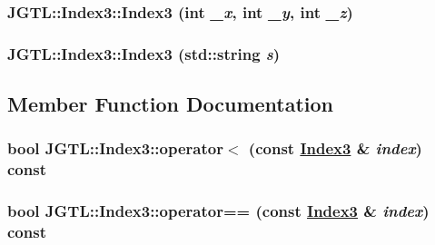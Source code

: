 \hypertarget{class_j_g_t_l_1_1_index3_31318bf64f28cdf0b0bd8aaf88dd6c80}{
\subsubsection[Index3]{\setlength{\rightskip}{0pt plus 5cm}JGTL::Index3::Index3 (int {\em \_\-x}, int {\em \_\-y}, int {\em \_\-z})}}
\label{class_j_g_t_l_1_1_index3_31318bf64f28cdf0b0bd8aaf88dd6c80}


\hypertarget{class_j_g_t_l_1_1_index3_57c5d0432d9042ef9c1c20eaff615ec7}{
\subsubsection[Index3]{\setlength{\rightskip}{0pt plus 5cm}JGTL::Index3::Index3 (std::string {\em s})}}
\label{class_j_g_t_l_1_1_index3_57c5d0432d9042ef9c1c20eaff615ec7}




\subsection{Member Function Documentation}
\hypertarget{class_j_g_t_l_1_1_index3_28b74fda507cd39db2cb49bd7a9eda11}{
\subsubsection[operator$<$]{\setlength{\rightskip}{0pt plus 5cm}bool JGTL::Index3::operator$<$ (const \hyperlink{class_j_g_t_l_1_1_index3}{Index3} \& {\em index}) const}}
\label{class_j_g_t_l_1_1_index3_28b74fda507cd39db2cb49bd7a9eda11}


\hypertarget{class_j_g_t_l_1_1_index3_e366c587a926599d5976c3ade146109a}{
\subsubsection[operator==]{\setlength{\rightskip}{0pt plus 5cm}bool JGTL::Index3::operator== (const \hyperlink{class_j_g_t_l_1_1_index3}{Index3} \& {\em index}) const}}
\label{class_j_g_t_l_1_1_index3_e366c587a926599d5976c3ade146109a}


